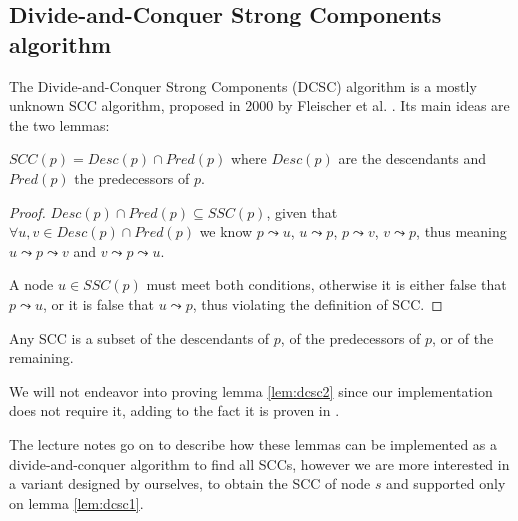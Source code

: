 \subsection[DCSC algorithm]{Divide-and-Conquer Strong Components algorithm} \label{algorithm-scc-dcsc}
The Divide-and-Conquer Strong Components (DCSC) algorithm is a mostly unknown SCC algorithm, proposed in 2000 by Fleischer et al. \cite{fleischer-dcsc}. Its main ideas are the two lemmas:
\begin{lemma} \label{lem:dcsc1}
    $SCC(p)=Desc(p) \cap Pred(p)$ where $Desc(p)$ are the descendants and $Pred(p)$ the predecessors of $p$.
\end{lemma}
\begin{proof}
    $Desc(p) \cap Pred(p) \subseteq SSC(p)$, given that $\forall u, v \in Desc(p) \cap Pred(p)$ we know $p \leadsto u$, $u \leadsto p$, $p \leadsto v$, $v \leadsto p$, thus meaning $u \leadsto p \leadsto v$ and $v \leadsto p \leadsto u$.\par
    A node $u \in SSC(p)$ must meet both conditions, otherwise it is either false that $p \leadsto u$, or it is false that $u \leadsto p$, thus violating the definition of SCC.
\end{proof}
\begin{lemma} \label{lem:dcsc2}
    Any SCC is a subset of the descendants of $p$, of the predecessors of $p$, or of the remaining.
\end{lemma}
We will not endeavor into proving lemma \ref{lem:dcsc2} since our implementation does not require it, adding to the fact it is proven in \cite{fleischer-dcsc}.\par
The lecture notes go on to describe how these lemmas can be implemented as a divide-and-conquer algorithm to find all SCCs, however we are more interested in a variant designed by ourselves, to obtain the SCC of node $s$ and supported only on lemma \ref{lem:dcsc1}.
